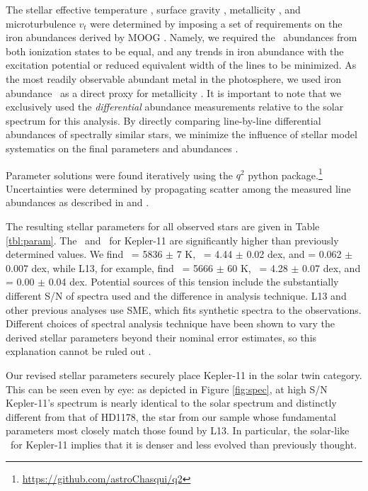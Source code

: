 \documentclass[oneside]{emulateapj}
\begin{document}
The stellar effective temperature \teff, surface gravity \logg, metallicity \mh, and microturbulence $v_t$ were determined by imposing a set of requirements on the iron abundances derived by MOOG \citep{Sneden1973}. Namely, we required the \feh\ abundances from both ionization states to be equal, and any trends in iron abundance with the excitation potential or reduced equivalent width of the lines to be minimized. As the most readily observable abundant metal in the photosphere, we used iron abundance \feh\ as a direct proxy for metallicity \mh. It is important to note that we exclusively used the \textit{differential} abundance measurements relative to the solar spectrum for this analysis. By directly comparing line-by-line differential abundances of spectrally similar stars, we minimize the influence of stellar model systematics on the final parameters and abundances \citep[see e.g.][]{Ramirez2014}. 

Parameter solutions were found iteratively using the $q^2$ python package.\footnote{\url{https://github.com/astroChasqui/q2}} Uncertainties were determined by propagating scatter among the measured line abundances as described in \citet{Epstein2010} and \citet{Bensby2014}.

The resulting stellar parameters for all observed stars are given in Table \ref{tbl:param}. The \teff\ and \logg\ for Kepler-11 are significantly higher than previously determined values. We find \teff\ = 5836 $\pm$ 7 K, \logg\ = 4.44 $\pm$ 0.02 dex, and \feh = 0.062 $\pm$ 0.007 dex, while L13, for example, find \teff\ = 5666 $\pm$ 60 K, \logg\ = 4.28 $\pm$ 0.07 dex, and \feh = 0.00 $\pm$ 0.04 dex. Potential sources of this tension include the substantially different S/N of spectra used and the difference in analysis technique. L13 and other previous analyses use SME, which fits synthetic spectra to the observations. Different choices of spectral analysis technique have been shown to vary the derived stellar parameters beyond their nominal error estimates, so this explanation cannot be ruled out \citep{Hinkel2016}.

Our revised stellar parameters securely place Kepler-11 in the solar twin category. This can be seen even by eye: as depicted in Figure \ref{fig:spec}, at high S/N Kepler-11's spectrum is nearly identical to the solar spectrum and distinctly different from that of HD1178, the star from our sample whose fundamental parameters most closely match those found by L13. In particular, the solar-like \logg\ for Kepler-11 implies that it is denser and less evolved than previously thought.
\end{document}
